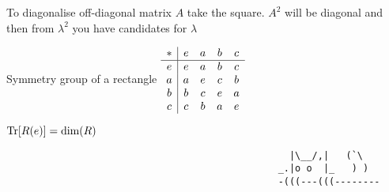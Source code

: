\columnbreak

\begin{squishlist}
    \item To diagonalise off-diagonal matrix $A$ take the square. $A^2$ will be diagonal and then from $\lambda^2$ you have candidates for $\lambda$
    \item Symmetry group of a rectangle 
    $\begin{array}{c | c c c c}
        * & e & a & b & c \\
        \hline
        e & e & a & b & c \\
        a & a & e & c & b \\
        b & b & c & e & a \\
        c & c & b & a & e
    \end{array}$

    \item $\mathrm{Tr}[R(e)] = \text{dim}(R)$
\end{squishlist}



\vfill
    \begin{verbatim}
                                                  |\__/,|   (`\
                                                _.|o o  |_   ) )
                                                -(((---(((--------
    \end{verbatim}

